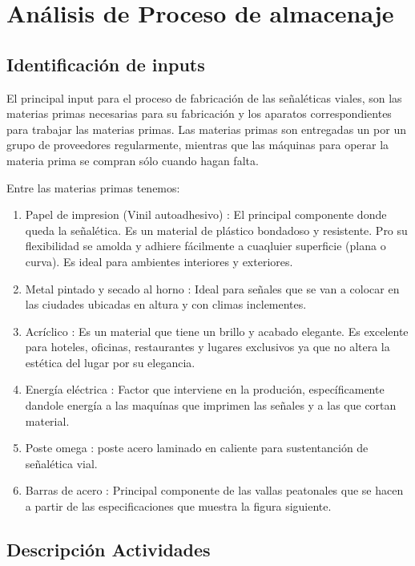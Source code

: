\section{Análisis de Proceso de almacenaje}
	\subsection{Identificación de inputs}

	El principal input para el proceso de fabricación de las señaléticas viales, son las materias primas necesarias para su fabricación y los aparatos correspondientes para trabajar las materias primas. Las materias primas son entregadas un por un grupo de proveedores regularmente, mientras que las máquinas para operar la materia prima se compran sólo cuando hagan falta.
	
	Entre las materias primas tenemos:
	
    \begin{enumerate}[1)]
    \item Papel de impresion (Vinil autoadhesivo) : El principal componente donde queda la señalética. Es un material de plástico bondadoso y resistente. Pro su flexibilidad se amolda y adhiere fácilmente a cuaqluier superficie (plana o curva). Es ideal para ambientes interiores y exteriores.
    \item Metal pintado y secado al horno : Ideal para señales que se van a colocar en las ciudades ubicadas en altura y con climas inclementes.
    \item Acríclico : Es un material que tiene un brillo y acabado elegante. Es excelente para hoteles, oficinas, restaurantes y lugares exclusivos ya que no altera la estética del lugar por su elegancia.
    \item Energía eléctrica : Factor que interviene en la produción, específicamente dandole energía a las maquínas que imprimen las señales y a las que cortan material.
    \item Poste omega :  poste acero laminado en caliente para sustentanción de señalética vial.
    \item Barras de acero : Principal componente de las vallas peatonales que se hacen a partir de las especificaciones que muestra la figura siguiente.
    \newpage
    \end{enumerate}
	\subsection{Descripción Actividades}

